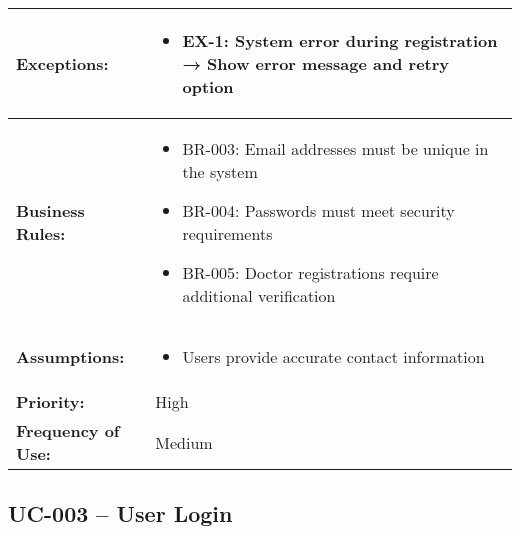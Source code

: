 \documentclass[12pt,a4paper]{article}
\begin{document}
\begin{longtable}{|p{4.5cm}|p{10.5cm}|}
\hline
\textbf{Exceptions:} &
\begin{itemize}
  \item EX-1: System error during registration → Show error message and retry option
\end{itemize} \\
\hline
\textbf{Business Rules:} &
\begin{itemize}
  \item BR-003: Email addresses must be unique in the system
  \item BR-004: Passwords must meet security requirements
  \item BR-005: Doctor registrations require additional verification
\end{itemize} \\
\hline
\textbf{Assumptions:} &
\begin{itemize}
  \item Users provide accurate contact information
\end{itemize} \\
\hline
\textbf{Priority:} & High \\
\hline
\textbf{Frequency of Use:} & Medium \\
\hline
\end{longtable}

\subsection{UC-003 – User Login}
\end{document}
